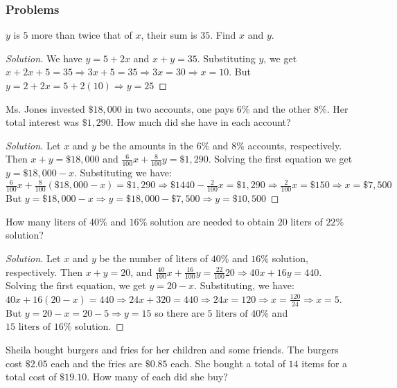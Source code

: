 \documentclass[crop=false,class=book,oneside]{standalone}
\begin{document}
            \subsubsection{Problems}
            \begin{problem}
            $y$ is $5$ more than twice that of $x$, their sum is $35$. Find $x$ and $y$.
            \end{problem}
            \begin{proof}[Solution]
            We have $y=5+2x$ and $x+y=35$. Substituting $y$, we get $x+2x+5=35\Rightarrow 3x+5=35\Rightarrow 3x=30\Rightarrow\boxed{x=10}$. But $y=2+2x=5+2(10)\Rightarrow\boxed{y=25}$
            \end{proof}
            \begin{problem}
            Ms. Jones invested $\$18,\!000$ in two accounts, one pays $6\%$ and the other $8\%$. Her total interest was $\$1,\!290$. How much did she have in each account?
            \end{problem}
            \begin{proof}[Solution]
            Let $x$ and $y$ be the amounts in the $6\%$ and $8\%$ accounts, respectively. Then $x+y=\$18,\!000$ and $\frac{6}{100}x+\frac{8}{100}y=\$1,\!290$. Solving the first equation we get $y=\$18,\!000-x$. Substituting we have: $\frac{6}{100}x+\frac{8}{100}(\$18,\!000-x)=\$1,\!290\Rightarrow \$1440-\frac{2}{100}x=\$1,\!290\Rightarrow\frac{2}{100}x=\$150\Rightarrow\boxed{x=\$7,\!500}$ But $y=\$18,\!000-x\Rightarrow y=\$18,\!000-\$7,\!500\Rightarrow\boxed{y=\$10,\!500}$
            \end{proof}
            \begin{problem}
            How many liters of $40\%$ and $16\%$ solution are needed to obtain $20$ liters of $22\%$ solution?
            \end{problem}
            \begin{proof}[Solution]
            Let $x$ and $y$ be the number of liters of $40\%$ and $16\%$ solution, respectively. Then $x+y=20$, and $\frac{40}{100}x+\frac{16}{100}y=\frac{22}{100}20\Rightarrow 40x+16y=440$. Solving the first equation, we get $y=20-x$. Substituting, we have: $40x+16(20-x)=440\Rightarrow 24x+320=440\Rightarrow 24x=120\Rightarrow x=\frac{120}{24}\Rightarrow\boxed{x=5}$. But $y=20-x=20-5\Rightarrow \boxed{y=15}$ so there are $\boxed{5\textrm{ liters of }40\%}$ and $\boxed{15\textrm{ liters of }16\%}$ solution.
            \end{proof}
            \begin{problem}
            Sheila bought burgers and fries for her children and some friends. The burgers cost $\$2.05$ each and the fries are $\$0.85$ each. She bought a total of $14$ items for a total cost of $\$19.10$. How many of each did she buy?
            \end{problem}
\end{document}
